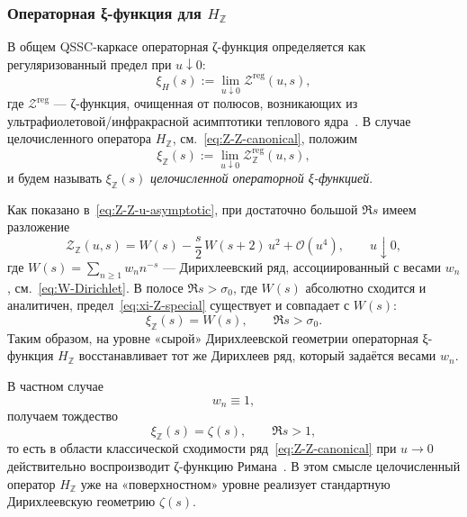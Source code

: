 \documentclass{article}
\numberwithin{equation}{section}
\theoremstyle{plain}
\theoremstyle{definition}
\theoremstyle{remark}
\begin{document}
\subsubsection{Операторная ξ-функция для $H_{\mathbb Z}$}
\label{subsubsec:xi-Z-def}

\noindent
В общем QSSC-каркасе операторная ζ-функция определяется как
регуляризованный предел при $u\downarrow 0$:
\begin{equation}
\label{eq:xi-Z-def}
\xi_{H}(s)
:=
\lim_{u\downarrow 0}
\mathcal Z^{\mathrm{reg}}(u,s),
\end{equation}
где $\mathcal Z^{\mathrm{reg}}$ — ζ-функция, очищенная от
полюсов, возникающих из ультрафиолетовой/инфракрасной асимптотики
теплового ядра~\cite{Monakhov-QSG-002,Elizalde1995}.
В случае целочисленного оператора $H_{\mathbb Z}$,
см.~\eqref{eq:Z-Z-canonical}, положим
\begin{equation}
\label{eq:xi-Z-special}
\xi_{\mathbb Z}(s)
:=
\lim_{u\downarrow 0}
\mathcal Z_{\mathbb Z}^{\mathrm{reg}}(u,s),
\end{equation}
и будем называть $\xi_{\mathbb Z}(s)$ \emph{целочисленной операторной ξ-функцией}.

Как показано в~\eqref{eq:Z-Z-u-asymptotic}, при достаточно большой
$\Re s$ имеем разложение
\begin{equation}
\label{eq:Z-Z-u-asymptotic-again}
\mathcal Z_{\mathbb Z}(u,s)
=
W(s)
-
\frac{s}{2}\,W(s+2)\,u^{2}
+
\mathcal O(u^{4}),
\qquad
u\downarrow 0,
\end{equation}
где $W(s)=\sum_{n\ge 1}w_n n^{-s}$ — Дирихлеевский ряд,
ассоциированный с весами $w_n$, см.~\eqref{eq:W-Dirichlet}.
В полосе $\Re s>\sigma_0$, где $W(s)$ абсолютно сходится и аналитичен,
предел~\eqref{eq:xi-Z-special} существует и совпадает с $W(s)$:
\begin{equation}
\label{eq:xi-Z-equals-W}
\xi_{\mathbb Z}(s)=W(s),
\qquad
\Re s>\sigma_0.
\end{equation}
Таким образом, на уровне «сырой» Дирихлеевской геометрии
операторная ξ-функция $H_{\mathbb Z}$ восстанавливает тот же
Дирихлеев ряд, который задаётся весами $w_n$.

В частном случае
\begin{equation}
\label{eq:weights-constant}
w_n\equiv 1,
\end{equation}
получаем тождество
\begin{equation}
\label{eq:xi-Z-equals-zeta}
\xi_{\mathbb Z}(s)=\zeta(s),
\qquad
\Re s>1,
\end{equation}
то есть в области классической сходимости
ряд~\eqref{eq:Z-Z-canonical} при $u\to 0$ действительно воспроизводит
ζ-функцию Римана~\cite{Titchmarsh1986}. В этом смысле целочисленный оператор
$H_{\mathbb Z}$ уже на «поверхностном» уровне реализует стандартную
Дирихлеевскую геометрию $\zeta(s)$.
\end{document}
